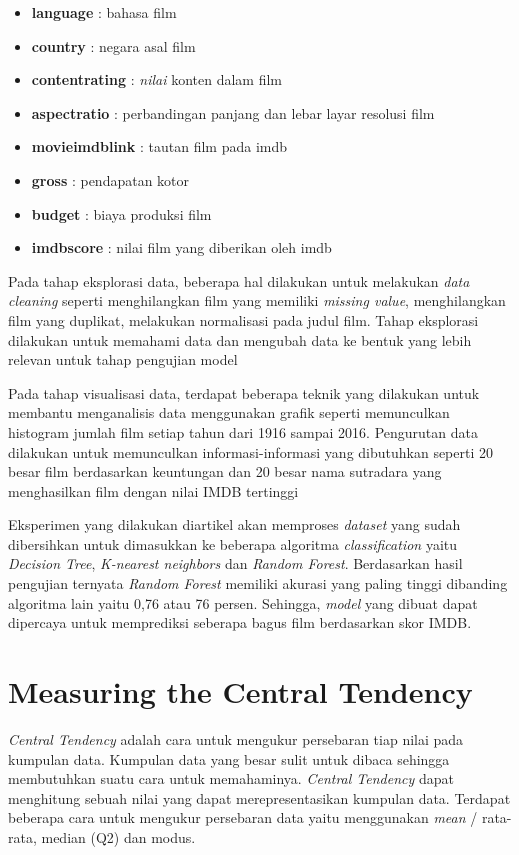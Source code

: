 \begin{itemize}
\item \textbf{language} : bahasa film 
\item \textbf{country} : negara asal film 
\item \textbf{content\textunderscore rating} : \textit{nilai} konten dalam film 
\item \textbf{aspect\textunderscore ratio} : perbandingan panjang dan lebar layar resolusi film 
\item \textbf{movie\textunderscore imdb\textunderscore link} : tautan film pada imdb 
\item \textbf{gross} : pendapatan kotor 
\item \textbf{budget} : biaya produksi film 
\item \textbf{imdb\textunderscore score} : nilai film yang diberikan oleh imdb 
\end{itemize}

Pada tahap eksplorasi data, beberapa hal dilakukan untuk melakukan \textit{data cleaning} seperti menghilangkan film yang memiliki \textit{missing value}, menghilangkan film yang duplikat, melakukan normalisasi pada judul film. Tahap  eksplorasi dilakukan untuk memahami data dan mengubah data ke bentuk yang lebih relevan untuk tahap pengujian model

Pada tahap visualisasi data, terdapat beberapa teknik yang dilakukan untuk membantu menganalisis data menggunakan grafik seperti memunculkan histogram jumlah film setiap tahun dari 1916 sampai 2016. Pengurutan data dilakukan untuk memunculkan informasi-informasi yang dibutuhkan seperti 20 besar film 
berdasarkan keuntungan dan 20 besar nama sutradara yang menghasilkan film dengan nilai IMDB tertinggi

Eksperimen yang dilakukan diartikel akan memproses \textit{dataset} yang sudah dibersihkan untuk dimasukkan ke beberapa algoritma \textit{classification} yaitu \textit{Decision Tree}, \textit{K-nearest neighbors} dan \textit{Random Forest}. Berdasarkan hasil pengujian ternyata \textit{Random Forest} memiliki akurasi yang paling tinggi dibanding algoritma lain yaitu 0,76 atau 76 persen. Sehingga, \textit{model} yang dibuat dapat dipercaya untuk memprediksi seberapa bagus film berdasarkan skor IMDB.		

\section{Measuring the Central Tendency}
\textit{Central Tendency} adalah cara untuk mengukur persebaran tiap nilai pada kumpulan data. Kumpulan data yang besar sulit untuk dibaca sehingga membutuhkan suatu cara untuk memahaminya.  \textit{Central Tendency} dapat menghitung sebuah nilai yang dapat merepresentasikan kumpulan data. Terdapat beberapa cara untuk mengukur persebaran data yaitu menggunakan \textit{mean} / rata-rata, median (Q2) dan modus.  

